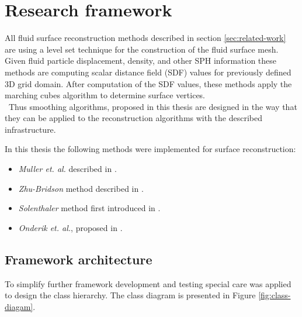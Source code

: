 \chapter{Research framework}
All fluid surface reconstruction methods described in section \ref{sec:related-work} are using a level set technique for the construction of the fluid surface mesh. Given fluid particle displacement, density, and other SPH information these methods are computing scalar distance field (SDF) values for previously defined 3D grid domain. After computation of the SDF values, these methods apply the marching cubes algorithm to determine surface vertices.\\\
Thus smoothing algorithms, proposed in this thesis are designed in the way that they can be applied to the reconstruction algorithms with the described infrastructure.


In this thesis the following methods were implemented for surface reconstruction:
\begin{itemize}
  \item \emph{Muller et. al.} described in \cite{Muller}.
  \item \emph{Zhu-Bridson} method described in \cite{ZhuBridson}.
  \item \emph{Solenthaler} method first introduced in \cite{Solenthaler}.
  \item \emph{Onderik et. al.}, proposed in \cite{OnderikEtAl}.
\end{itemize}



\section{Framework architecture}
To simplify further framework development and testing special care was applied to design the class hierarchy. The class diagram is presented in Figure \ref{fig:class-diagam}.

